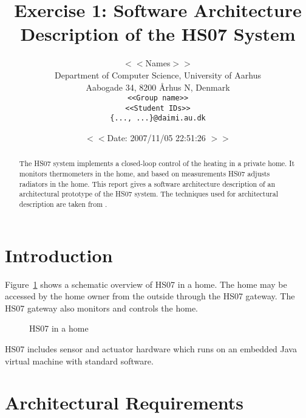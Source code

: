 \documentclass[a4paper,10pt]{article}
\begin{document}
\title{Exercise 1: Software Architecture Description of the HS07 System}

\author{
  $<<$Names$>>$\\
  Department of Computer Science, University of Aarhus\\
  Aabogade 34, 8200 {\AA}rhus N, Denmark\\
  \makeatletter
  \texttt{<<Group name>>}\\
  \texttt{<<Student IDs>>}\\
  \texttt{\{..., ...\}@daimi.au.dk}
}

\date{$<<$Date: 2007/11/05 22:51:26 $>>$}

\maketitle

\begin{abstract}
  The HS07 system implements a closed-loop control of the heating in a
  private home. It monitors thermometers in the home, and based on
  measurements HS07 adjusts radiators in the home. This report gives a
  software architecture description of an architectural prototype of
  the HS07 system. The techniques used for architectural description
  are taken from \cite{christensen2004archdesc}.
\end{abstract}

\section{Introduction}

Figure~\ref{fig:hs07} shows a schematic overview of HS07 in a
home. The home may be accessed by the home owner from the outside
through the HS07 gateway. The HS07 gateway also monitors and controls
the home.
\begin{figure}[!htb]
\centerline{}
\caption{HS07 in a home}
\label{fig:hs07}
\end{figure}

HS07 includes sensor and actuator hardware which runs on an embedded Java virtual
machine with standard software.

\section{Architectural Requirements}
\end{document}

